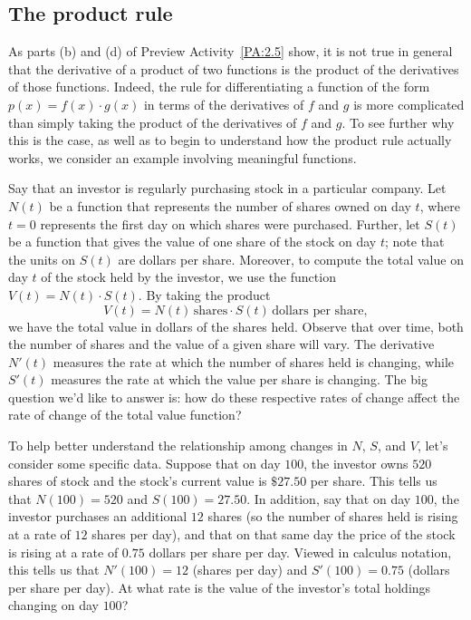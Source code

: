 
\subsection*{The product rule}

As parts (b) and (d) of Preview Activity~\ref{PA:2.5} show, it is not true in general that the derivative of a product of two functions is the product of the derivatives of those functions.  Indeed, the rule for differentiating a function of the form $p(x) = f(x) \cdot g(x)$ in terms of the derivatives of $f$ and $g$ is more complicated than simply taking the product of the derivatives of $f$ and $g$.  To see further why this is the case, as well as to begin to understand how the product rule actually works, we consider an example involving meaningful functions.

Say that an investor is regularly purchasing stock in a particular company.  Let $N(t)$ be a function that represents the number of shares owned on day $t$, where $t = 0$ represents the first day on which shares were purchased.  Further, let $S(t)$ be a function that gives the value of one share of the stock on day $t$; note that the units on $S(t)$ are dollars per share.  Moreover, to compute the total value on day $t$ of the stock held by the investor, we use the function $V(t) = N(t) \cdot S(t)$.  By taking the product 
$$V(t) = N(t) \, \mbox{shares} \cdot S(t) \, \mbox{dollars per share},$$ 
we have the total value in dollars of the shares held.  Observe that over time, both the number of shares and the value of a given share will vary.  The derivative $N'(t)$ measures the rate at which the number of shares held is changing, while $S'(t)$ measures the rate at which the value per share is changing.  The big question we'd like to answer is: how do these respective rates of change affect the rate of change of the total value function?

To help better understand the relationship among changes in $N$, $S$, and $V$, let's consider some specific data.  Suppose that on day $100$, the investor owns $520$ shares of stock and the stock's current value is $\$27.50$ per share.  This tells us that $N(100) = 520$ and $S(100) = 27.50$.  In addition, say that on day $100$, the investor purchases an additional $12$ shares (so the number of shares held is rising at a rate of $12$ shares per day), and that on that same day the price of the stock is rising at a rate of $0.75$ dollars per share per day.  Viewed in calculus notation, this tells us that $N'(100) = 12$ (shares per day) and $S'(100) = 0.75$ (dollars per share per day).  At what rate is the value of the investor's total holdings changing on day $100$?


